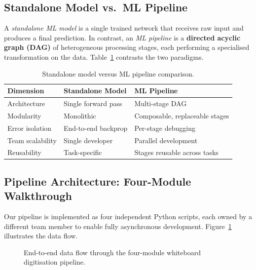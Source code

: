 \documentclass[11pt, a4paper]{article}
\begin{document}
\subsection{Standalone Model vs.\ ML Pipeline}

A \emph{standalone ML model} is a single trained network that receives raw input and produces a final prediction. In contrast, an \emph{ML pipeline} is a \textbf{directed acyclic graph (DAG)} of heterogeneous processing stages, each performing a specialised transformation on the data. Table~\ref{tab:model_vs_pipeline} contrasts the two paradigms.

\begin{table}[H]
\centering
\caption{Standalone model versus ML pipeline comparison.}
\label{tab:model_vs_pipeline}
\begin{tabular}{@{}lll@{}}
\toprule
\textbf{Dimension} & \textbf{Standalone Model} & \textbf{ML Pipeline} \\
\midrule
Architecture     & Single forward pass       & Multi-stage DAG \\
Modularity       & Monolithic                & Composable, replaceable stages \\
Error isolation  & End-to-end backprop       & Per-stage debugging \\
Team scalability & Single developer          & Parallel development \\
Reusability      & Task-specific             & Stages reusable across tasks \\
\bottomrule
\end{tabular}
\end{table}

\subsection{Pipeline Architecture: Four-Module Walkthrough}

Our pipeline is implemented as four independent Python scripts, each owned by a different team member to enable fully asynchronous development. Figure~\ref{fig:pipeline_flow} illustrates the data flow.

\begin{figure}[H]
  \centering
  \caption{End-to-end data flow through the four-module whiteboard digitisation pipeline.}
  \label{fig:pipeline_flow}
\end{figure}
\end{document}
